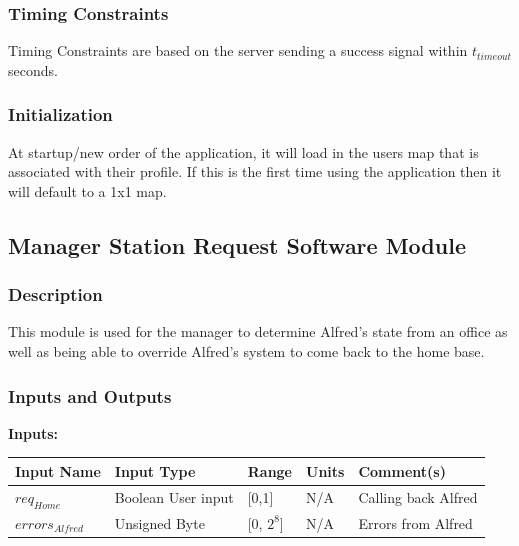 \documentclass [10pt]{article}
\begin{document}

\subsubsection{Timing Constraints}
Timing Constraints are based on the server sending a success signal within  $ t_{timeout} $ seconds.


\subsubsection{Initialization}
At startup/new order of the application, it will load in the users map that is associated with their profile. If this is the first time using the application then it will default to a 1x1 map.


\subsection{Manager Station Request Software Module}


\subsubsection{Description}
This module is used for the manager to determine Alfred's state from an office as well as being able to override Alfred's system to come back to the home base. 


\subsubsection{Inputs and Outputs}

\textbf{Inputs: } \\

\begin{longtable}{|l|l|l|l|l|}\hline 
	\rowcolor{tableCell}\textbf{Input Name} & \textbf{Input Type} & \textbf{Range} & \textbf{Units} & \textbf{Comment(s)} \\ \hline
	$ req_{Home} $ & Boolean User input &  [0,1] & N/A & Calling back Alfred \\ \hline
	\rowcolor{tableCell}$  errors_{Alfred} $ & Unsigned Byte & [0, $2^{8}$]& N/A & Errors from Alfred \\ \hline
\end{longtable}
\end{document}
